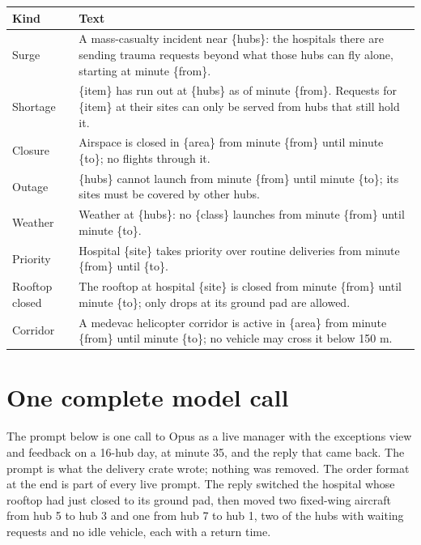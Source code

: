 \documentclass[conference]{IEEEtran}
\begin{document}
\begin{center}
\footnotesize
\begin{tabularx}{\columnwidth}{@{}lX@{}}
\toprule
Kind & Text \\
\midrule
Surge & A mass-casualty incident near \{hubs\}: the hospitals there are
sending trauma requests beyond what those hubs can fly alone, starting at
minute \{from\}. \\
Shortage & \{item\} has run out at \{hubs\} as of minute \{from\}. Requests
for \{item\} at their sites can only be served from hubs that still hold
it. \\
Closure & Airspace is closed in \{area\} from minute \{from\} until minute
\{to\}; no flights through it. \\
Outage & \{hubs\} cannot launch from minute \{from\} until minute \{to\};
its sites must be covered by other hubs. \\
Weather & Weather at \{hubs\}: no \{class\} launches from minute \{from\}
until minute \{to\}. \\
Priority & Hospital \{site\} takes priority over routine deliveries from
minute \{from\} until \{to\}. \\
Rooftop closed & The rooftop at hospital \{site\} is closed from minute
\{from\} until minute \{to\}; only drops at its ground pad are allowed. \\
Corridor & A medevac helicopter corridor is active in \{area\} from minute
\{from\} until minute \{to\}; no vehicle may cross it below 150 m. \\
\bottomrule
\end{tabularx}
\end{center}

\section{One complete model call}
\label{app:call}

The prompt below is one call to Opus as a live manager with the exceptions
view and feedback on a 16-hub day, at minute 35, and the reply that came
back. The prompt is what the delivery crate wrote; nothing was removed. The
order format at the end is part of every live prompt. The reply switched
the hospital whose rooftop had just closed to its ground pad, then moved
two fixed-wing aircraft from hub 5 to hub 3 and one from hub 7 to hub 1,
two of the hubs with waiting requests and no idle vehicle, each with a
return time.


\end{document}
